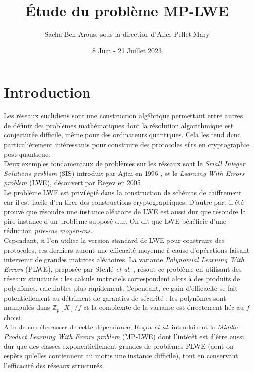 \documentclass[11pt,a4paper]{article}
\title{\textbf{Étude du problème MP-LWE}}
\date{8 Juin - 21 Juillet 2023}
\author{Sacha Ben-Arous, sous la direction d'Alice Pellet-Mary}
\begin{document}
\maketitle 



\tableofcontents
\newpage
\section{Introduction}
\; Les réseaux euclidiens sont une construction algébrique permettant entre autres de définir des problèmes mathématiques dont la résolution algorithmique est conjecturée difficile, même pour des ordinateurs quantiques. Cela les rend donc particulièrement intéressants pour construire des protocoles sûrs en cryptographie post-quantique. \\
Deux exemples fondamentaux de problèmes sur les réseaux sont le \textit{Small Integer Solutions problem} (SIS) introduit par Ajtai en 1996 \cite{sis}, et le \textit{Learning With Errors problem} (LWE), découvert par Regev en 2005 \cite{lwe}. \\
Le problème LWE est privilégié dans la construction de schémas de chiffrement car il est facile d'en tirer des constructions cryptographiques. D'autre part il été prouvé \cite{lwe} que résoudre une instance aléatoire de LWE est aussi dur que résoudre la pire instance d'un problème supposé dur. On dit que LWE bénéficie d'une réduction \textit{pire-cas moyen-cas}. \\
Cependant, si l'on utilise la version standard de LWE pour construire des protocoles, ces derniers auront une efficacité moyenne à cause d'opérations faisant intervenir de grandes matrices aléatoires. La variante \textit{Polynomial Learning With Errors} (PLWE), proposée par Stehlé \textit{et al.} \cite{plwe}, résout ce problème en utilisant des réseaux structurés : les calculs matriciels correspondent alors à des produits de polynômes, calculables plus rapidement. Cependant, ce gain d'efficacité se fait potentiellement au détriment de garanties de sécurité : les polynômes sont manipulés dans $\mathbb{Z}_p[X]/f$ et la complexité de la variante est directement liée au $f$ choisi. \\
Afin de se débarasser de cette dépendance, Roşca \textit{et al.} introduisent le \textit{Middle-Product Learning With Errors problem} (MP-LWE) \cite{mplwe} dont l'intérêt est d'être aussi dur que des classes exponentiellement grandes de problèmes PLWE (dont on espère qu'elles contiennent au moins une instance difficile), tout en conservant l'efficacité des réseaux structurés. \\
\end{document}
